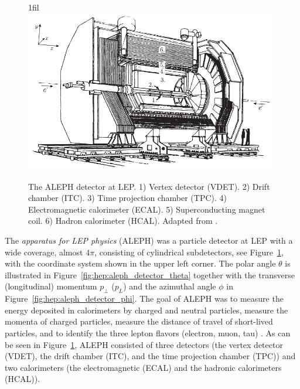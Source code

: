 \documentclass[a4paper, twoside, nobib]{tufte-book}
\makeatletter
\newcommand*{\centerfloat}{%
  \parindent \z@
  \leftskip \z@ \@plus 1fil \@minus \textwidth
  \rightskip\leftskip
  \parfillskip \z@skip}
\newcommand{\autocite}[1]{\citep{#1}}
\makeatother
\begin{document}
\begin{figure}
  \centerfloat
  \includegraphics[width=0.99\textwidth]{figures/ALEPH/aleph.pdf}
  \caption[The ALEPH detector]{The ALEPH detector at LEP. 1) Vertex detector (VDET). 2) Drift chamber (ITC). 3) Time projection chamber (TPC). 4) Electromagnetic calorimeter (ECAL). 5) Superconducting magnet coil. 6) Hadron calorimeter (HCAL). Adapted from \citet{buskulicInvestigationBd0Bs01994}.}
  \label{fig:hep:aleph_detector}
\end{figure}

The \emph{apparatus for LEP physics} (ALEPH) was a particle detector at LEP with a wide coverage, almost $4 \pi$, consisting of cylindrical subdetectors, see Figure~\ref{fig:hep:aleph_detector}, with the coordinate system shown in the upper left corner. The polar angle $\theta$ is illustrated in Figure~\ref{fig:hep:aleph_detector_theta} together with the transverse (longitudinal) momentum $p_\perp$ ($p_L$) and the azimuthal angle $\phi$ in Figure~\ref{fig:hep:aleph_detector_phi}. The goal of ALEPH was to measure the energy deposited in calorimeters by charged and neutral particles, measure the momenta of charged particles, measure the distance of travel of short-lived particles, and to identify the three lepton flavors (electron, muon, tau) \autocite{buskulicInvestigationBd0Bs01994}. As can be seen in Figure~\ref{fig:hep:aleph_detector}, ALEPH consisted of three detectors (the vertex detector (VDET), the drift chamber (ITC), and the time projection chamber (TPC)) and two calorimeters (the electromagnetic (ECAL) and the hadronic calorimeters (HCAL)). 
\end{document}
